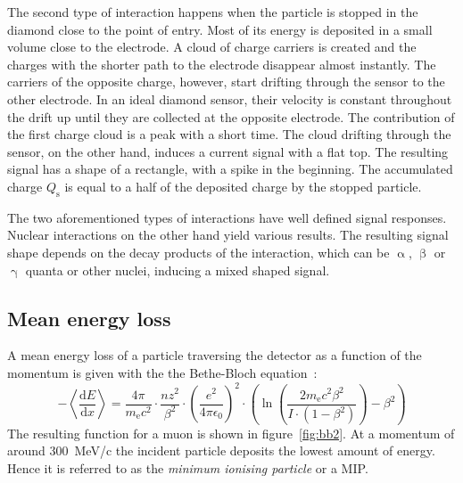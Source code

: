 The second type of interaction happens when the particle is stopped in the diamond close to the point of entry. Most of its energy is deposited in a small volume close to the electrode. A cloud of charge carriers is created and the charges with the shorter path to the electrode disappear almost instantly. The carriers of the opposite charge, however, start drifting through the sensor to the other electrode. In an ideal diamond sensor, their velocity is constant throughout the drift up until they are collected at the opposite electrode. The contribution of the first charge cloud is a peak with a short time. The cloud drifting through the sensor, on the other hand, induces a current signal with a flat top. The resulting signal has a shape of a rectangle, with a spike in the beginning. %
The accumulated charge $Q_\mathrm{s}$ is equal to a half of the deposited charge by the stopped particle.

The two aforementioned types of interactions have well defined signal responses. Nuclear interactions on the other hand yield various results. The resulting signal shape depends on the decay products of the interaction, which can be $\upalpha$, $\upbeta$ or $\upgamma$ quanta or other nuclei, inducing a mixed shaped signal. 



\subsection{Mean energy loss}
A mean energy loss of a particle traversing the detector as a function of the momentum is given with the the Bethe-Bloch equation~\cite{}: 
\begin{equation}
-\left\langle\frac{\mathrm{d}E}{\mathrm{d}x}\right\rangle = \frac{4\pi}{m_\mathrm{e}c^2}  \cdot \frac{nz^2}{\beta^2}  \cdot  \left(\frac{e^2}{4\pi\epsilon_\mathrm{0}}\right)^2  \cdot  \left( \ln \left(\frac{2m_\mathrm{e}c^2\beta^2}{I\cdot(1-\beta^2)}\right)-\beta^2  \right)
\label{eq:bethebloch}
\end{equation}
The resulting function for a muon is shown in figure~\ref{fig:bb2}. At a momentum of around 300~MeV/c the incident particle deposits the lowest amount of energy. Hence it is referred to as the \emph{minimum ionising particle} or a MIP.


